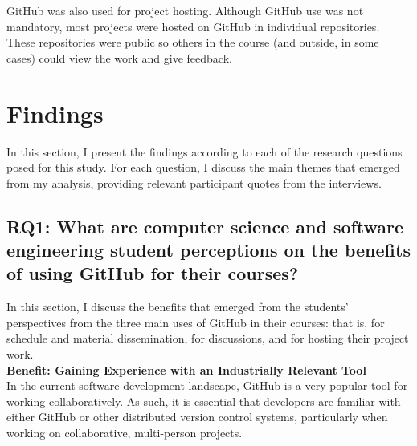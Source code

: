 GitHub was also used for project hosting. Although GitHub use was not mandatory, most projects were hosted on GitHub in individual repositories. These repositories were public so others in the course (and outside, in some cases) could view the work and give feedback. %

\section{Findings}

In this section, I present the findings according to each of the research questions posed for this study. For each question, I discuss the main themes that emerged from my analysis, providing relevant participant quotes from the interviews.




\subsection{RQ1: What are computer science and software engineering student perceptions on the benefits of using GitHub for their courses?}
In this section, I discuss the benefits that emerged from the students' perspectives from the three main uses of GitHub in their courses: that is, for schedule and material dissemination, for discussions, and for hosting their project work. \\ %

\textbf{Benefit: Gaining Experience with an Industrially Relevant Tool} \\
In the current software development landscape, GitHub is a very popular tool for working collaboratively. As such, it is essential that developers are familiar with either GitHub or other distributed version control systems, particularly when working on collaborative, multi-person projects.

